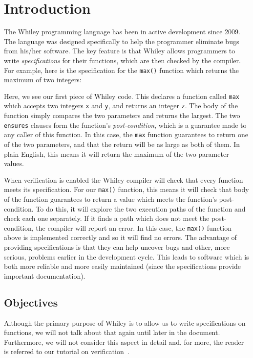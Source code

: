 \section{Introduction}
The Whiley programming language has been in active development since
2009.  The language was designed specifically to help the programmer
eliminate bugs from his/her software.  The key feature is that Whiley
allows programmers to write {\em specifications} for their functions,
which are then checked by the compiler.  For example, here is the
specification for the \lstinline{max()} function which returns the
maximum of two integers:



Here, we see our first piece of Whiley code.  This declares a function
called \lstinline{max} which accepts two integers \lstinline{x} and
\lstinline{y}, and returns an integer \lstinline{z}.  The body of the
function simply compares the two parameters and returns the largest.
The two \lstinline{ensures} clauses form the function's {\em
  post-condition}, which is a guarantee made to any caller of this
function.  In this case, the \lstinline{max} function guarantees to
return one of the two parameters, and that the return will be as large
as both of them.  In plain English, this means it will return the
maximum of the two parameter values.

When verification is enabled the Whiley compiler will check that every
function meets its specification.  For our \lstinline{max()} function,
this means it will check that body of the function guarantees to
return a value which meets the function's post-condition.  To do this,
it will explore the two execution paths of the function and check each
one separately.  If it finds a path which does not meet the
post-condition, the compiler will report an error.  In this case, the
\lstinline{max()} function above is implemented correctly and so it
will find no errors.  The advantage of providing specifications is
that they can help uncover bugs and other, more serious, problems
earlier in the development cycle.  This leads to software which is
both more reliable and more easily maintained (since the
specifications provide important documentation).

\subsection{Objectives}

Although the primary purpose of Whiley is to allow us to write
specifications on functions, we will not talk about that again until
later in the document.  Furthermore, we will not consider this aspect
in detail and, for more, the reader is referred to our tutorial on
verification~\cite{Pea13x}.

